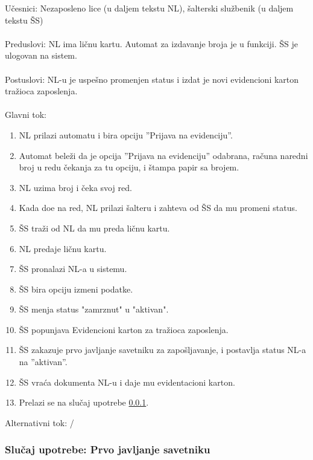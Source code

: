 \noindent  U\v cesnici: Nezaposleno lice (u daljem tekstu NL), \v salterski slu\v zbenik (u daljem tekstu \v SS)
\\
\\ Preduslovi: NL ima li\v cnu kartu. Automat za izdavanje broja je u funkciji. \v SS je ulogovan na sistem. 
\\
\\ Postuslovi: NL-u je uspe\v sno promenjen status i izdat je novi evidencioni karton tra\v zioca zaposlenja.
\\
\\ Glavni tok:
\begin{enumerate}
	\item NL prilazi automatu i bira opciju ''Prijava na evidenciju''.
	\item Automat bele\v zi da je opcija ''Prijava na evidenciju'' odabrana, ra\v cuna naredni broj u redu \v cekanja za tu opciju, i \v stampa papir sa brojem.
	\item NL uzima broj i \v ceka svoj red.
	\item Kada do\dj e na red, NL prilazi \v salteru i zahteva od \v SS da mu promeni status.
	\item \v SS tra\v zi od NL da mu preda li\v cnu kartu.
	\item NL predaje li\v cnu kartu.
	\item \v SS pronalazi NL-a u sistemu. 
	\item \v SS bira opciju izmeni podatke.
	\item \v SS menja status "zamrznut" u "aktivan".
	\item \v SS popunjava Evidencioni karton za tra\v zioca zaposlenja.
	\item \v SS zakazuje prvo javljanje savetniku za zapo\v sljavanje, i postavlja status NL-a na ''aktivan''.
	\item \v SS vra\' ca dokumenta NL-u i daje mu evidentacioni karton.
	\item Prelazi se na slu\v caj upotrebe \ref{su: prvo javljanje savetniku}.
\end{enumerate}

\noindent Alternativni tok: /

\subsubsection{Slu\v caj upotrebe: Prvo javljanje savetniku}
\label{su: prvo javljanje savetniku}


